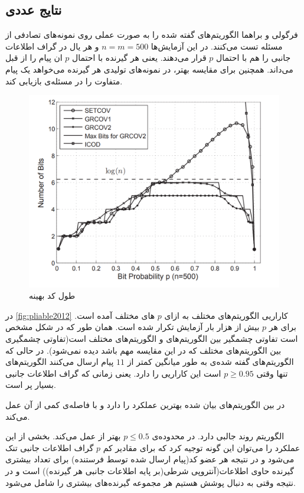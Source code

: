 \subsection{
نتایج عددی
}
فرگولی و براهما  الگوریتم‌های گفته شده را به صورت عملی روی نمونه‌های تصادفی از مسئله تست می‌کنند. در این آزمایش‌ها 
$n = m = 500$
و هر یال در گراف اطلاعات جانبی را هم با احتمال
$p$
قرار می‌دهند. یعنی هر گیرنده با احتمال
$p$
ان پیام‌ را از قبل می‌داند. همچنین برای مقایسه بهتر، در نمونه‌های تولیدی هر گیرنده می‌خواهد یک پیام متفاوت را در مسئله‌ی
\icod
بازیابی کند.
\begin{figure}
	\centering
	\includegraphics[width=0.7\linewidth]{figs/ch3/pliable2012}
	\caption[
	طول کد بهینه
	]{طول کد بهینه\cite{pliablefirstpaper}}
	\label{fig:pliable2012}
\end{figure}

در 
\autoref{fig:pliable2012}
کاراریی الگوریتم‌های مختلف به ازای 
$p$
های مختلف آمده است. برای هر
$p$
بیش از هزار بار آزمایش تکرار شده است. همان طور که در شکل مشخص است تفاوتی چشمگیر بین الگوریتم‌های
\picod
و الگوریتم‌های مختلف
\icod
است(تفاوتی چشمگیری بین الگوریتم‌های مختلف
\icod
که در این مقایسه مهم باشد دیده نمی‌شود). در حالی که الگوریتم‌های گفته شده‌ی
\picod
به طور میانگین کمتر از
$11$
پیام ارسال می‌کنند الگوریتم‌های
\icod
تنها وقتی
$p \geq 0.95$
است این کاراریی را دارد. یعنی زمانی که گراف اطلاعات جانبی بسیار پر است.

در بین الگوریتم‌های بیان شده
بهترین عملکرد را دارد و
با فاصله‌ی کمی از آن عمل می‌کند.

الگوریتم
روند جالبی دارد. در محدوده‌ی 
$p \leq 0.5$
بهتر از
عمل می‌کند. بخشی از این عملکرد را می‌توان این گونه توجیه کرد که برای مقادیر کم
$p$
گراف اطلاعات جانبی تنک می‌شود و در نتیجه هر عضو کد(پیام ارسال شده توسط فرستنده)  برای تعداد بیشتری گیرنده حاوی اطلاعات(آنتروپی شرطی(بر پایه اطلاعات جانبی هر گیرنده)) است و در نتیجه وقتی به دنبال پوشش هستیم هر مجموعه گیرنده‌های بیشتری را شامل می‌شود.

